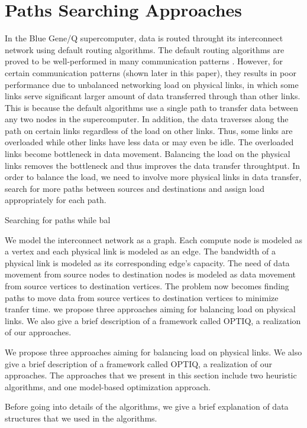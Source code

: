 \section{Paths Searching Approaches}
\label{sec:approach}

In the Blue Gene/Q supercomputer, data is routed throught its interconnect network using default routing algorithms. The default routing algorithms are proved to be well-performed in many communication patterns \cite{Chen:BGQ}. However, for certain communication patterns (shown later in this paper), they results in poor performance due to unbalanced networking load on physical links, in which some links serve significant larger amount of data transferred through than other links. This is because the default algorithms use a single path to transfer data between any two nodes in the supercomputer. In addition, the data traverses along the path on certain links regardless of the load on other links. Thus, some links are overloaded while other links have less data or may even be idle. The overloaded links become bottleneck in data movement. Balancing the load on the physical links removes the bottleneck and thus improves the data transfer throughtput. In order to balance the load, we need to involve more physical links in data transfer, search for more paths between sources and destinations and assign load appropriately for each path.

Searching for paths while bal

We model the interconnect network as a graph. Each compute node is modeled as a vertex and each physical link is modeled as an edge. The bandwidth of a physical link is modeled as its corresponding edge's capacity. The need of data movement from source nodes to destination nodes is modeled as data movement from source vertices to destination vertices. The problem now becomes finding paths to move data from source vertices to destination vertices to minimize tranfer time. we propose three approaches aiming for balancing load on physical links. We also give a brief description of a framework called OPTIQ, a realization of our approaches. 

We propose three approaches aiming for balancing load on physical links. We also give a brief description of a framework called OPTIQ, a realization of our approaches. The approaches that we present in this section include two heuristic algorithms, and one model-based optimization approach. 

Before going into details of the algorithms, we give a brief explanation of data structures that we used in the algorithms.

